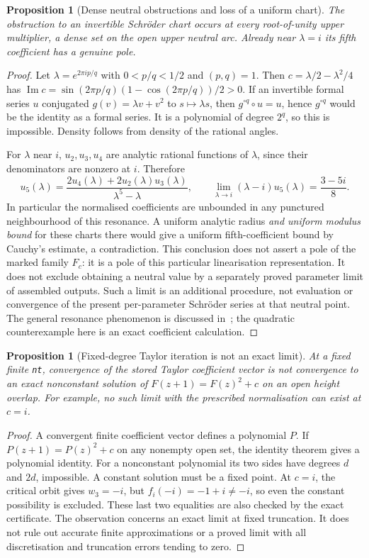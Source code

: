 \documentclass[11pt]{article}
\newtheorem{proposition}[theorem]{Proposition}
\newcommand{\im}{\operatorname{Im}}
\begin{document}
\begin{proposition}[Dense neutral obstructions and loss of a uniform chart]
\label{prop:theta-resonances}
The obstruction to an invertible Schr\"oder chart occurs at every
root-of-unity upper multiplier, a dense set on the open upper neutral
arc. Already near $\lambda=i$ its fifth coefficient has a genuine pole.
\end{proposition}
\begin{proof}
Let $\lambda=e^{2\pi i p/q}$ with $0<p/q<1/2$ and $(p,q)=1$.
Then $c=\lambda/2-\lambda^2/4$ has
$\im c=\sin(2\pi p/q)(1-\cos(2\pi p/q))/2>0$.
If an invertible formal series $u$ conjugated
$g(v)=\lambda v+v^2$ to $s\mapsto\lambda s$, then
$g^{\circ q}\circ u=u$, hence $g^{\circ q}$ would be the identity
as a formal series. It is a polynomial of degree $2^q$, so this is
impossible. Density follows from density of the rational angles.

For $\lambda$ near $i$, $u_2,u_3,u_4$ are analytic rational functions
of $\lambda$, since their denominators are nonzero at $i$. Therefore
\[
 u_5(\lambda)=\frac{2u_4(\lambda)+2u_2(\lambda)u_3(\lambda)}
 {\lambda^5-\lambda},\qquad
 \lim_{\lambda\to i}(\lambda-i)u_5(\lambda)=\frac{3-5i}{8}.
\]
In particular the normalised coefficients are unbounded in any
punctured neighbourhood of this resonance. A uniform analytic radius
\emph{and uniform modulus bound} for these charts there would give a
uniform fifth-coefficient bound by Cauchy's estimate, a contradiction.
This conclusion does not assert a pole of the marked family $F_c$:
it is a pole of this particular linearisation representation.
It does not exclude obtaining a neutral value by a separately proved
parameter limit of assembled outputs. Such a limit is an additional
procedure, not evaluation or convergence of the present per-parameter
Schr\"oder series at that neutral point.
The general resonance phenomenon is discussed in~\cite{BMS}; the
quadratic counterexample here is an exact coefficient calculation.
\end{proof}

\begin{proposition}[Fixed-degree Taylor iteration is not an exact limit]
\label{prop:finite-taylor}
At a fixed finite \texttt{nt}, convergence of the stored Taylor
coefficient vector is not convergence to an exact nonconstant solution
of $F(z+1)=F(z)^2+c$ on an open height overlap. For example, no such
limit with the prescribed normalisation can exist at $c=i$.
\end{proposition}
\begin{proof}
A convergent finite coefficient vector defines a polynomial $P$.
If $P(z+1)=P(z)^2+c$ on any nonempty open set, the identity theorem
gives a polynomial identity. For a nonconstant polynomial its two
sides have degrees $d$ and $2d$, impossible. A constant solution
must be a fixed point. At $c=i$, the critical orbit gives $w_3=-i$,
but $f_i(-i)=-1+i\ne-i$, so even the constant possibility is excluded.
These last two equalities are also checked by the exact certificate.
The observation concerns an exact limit at fixed truncation. It does
not rule out accurate finite approximations or a proved limit with
all discretisation and truncation errors tending to zero.
\end{proof}
\end{document}
